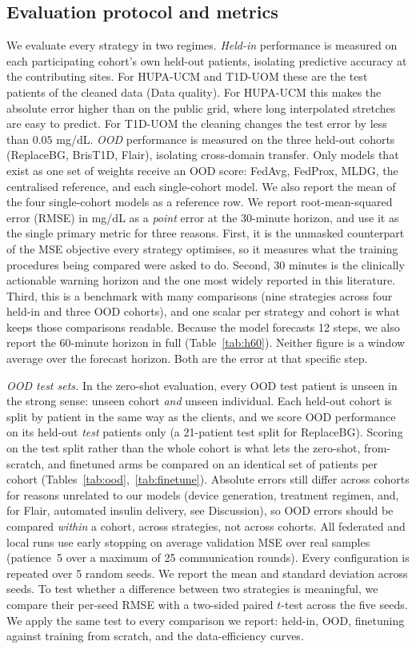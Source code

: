 \documentclass[10pt,letterpaper]{article}
\begin{document}
\subsection*{Evaluation protocol and metrics}

We evaluate every strategy in two regimes. \emph{Held-in} performance is measured
on each participating cohort's own held-out patients, isolating predictive
accuracy at the contributing sites. For HUPA-UCM and T1D-UOM these are the
test patients of the cleaned data (Data quality). For HUPA-UCM this makes the
absolute error higher than on the public grid, where long interpolated
stretches are easy to predict. For T1D-UOM the cleaning changes the test error
by less than $0.05$ mg/dL. \emph{OOD} performance is measured on the
three held-out cohorts (ReplaceBG, BrisT1D, Flair), isolating cross-domain
transfer. Only models that exist as one set of weights receive an OOD score:
FedAvg, FedProx, MLDG, the centralised reference, and each single-cohort
model. We also report the mean of the four single-cohort models as a
reference row.
We report root-mean-squared error (RMSE) in mg/dL as a \emph{point} error at the
30-minute horizon, and use it as the single primary metric for three reasons.
First, it is the unmasked counterpart of the MSE objective every strategy
optimises, so it measures what the training procedures being compared were
asked to do.
Second, 30 minutes is the clinically actionable warning horizon and the one most
widely reported in this literature. Third, this is a benchmark with many
comparisons (nine strategies across four held-in and three OOD cohorts), and
one scalar per strategy and cohort is what keeps those comparisons readable. Because the model
forecasts 12 steps, we also report the 60-minute horizon in full
(Table~\ref{tab:h60}). Neither figure is a window average
over the forecast horizon. Both are the error at that specific step.

\emph{OOD test sets.} In the zero-shot evaluation, every OOD test patient is
unseen in the strong sense: unseen cohort \emph{and} unseen individual. Each
held-out cohort is split by patient in
the same way as the clients, and we score OOD performance on its held-out
\emph{test} patients only (a 21-patient test split for ReplaceBG). Scoring on the
test split rather than the whole cohort is what lets the zero-shot, from-scratch,
and finetuned arms be compared on an identical set of patients per cohort
(Tables~\ref{tab:ood},~\ref{tab:finetune}). Absolute errors still differ across
cohorts for reasons unrelated to our models (device generation, treatment
regimen, and, for Flair, automated insulin delivery, see Discussion), so OOD
errors should be compared \emph{within} a cohort, across strategies, not across
cohorts. All federated and local runs use early stopping on average
validation MSE over real samples (patience~5 over a maximum of 25
communication rounds). Every configuration is repeated over 5 random seeds. We report the mean and standard
deviation across seeds. To test whether a difference between two strategies is
meaningful, we compare their per-seed RMSE with a two-sided paired $t$-test
across the five seeds. We apply the same test to every comparison we report:
held-in, OOD, finetuning against training from scratch, and the data-efficiency
curves.
\end{document}
